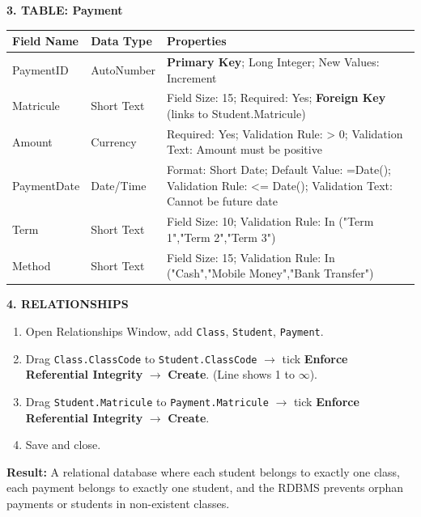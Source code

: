 \documentclass[11pt]{article}
\newcounter{popsec}
\newcounter{popsub}
\newcommand{\courssub}[1]{%
  \stepcounter{popsub}%
  \par\vspace{9pt}\noindent{\popxbold\fontsize{11.5}{13}\selectfont\color{popink}{\color{poporange}\thepopsec.\thepopsub}\hspace{6pt}#1}\par\nopagebreak\vspace{4pt}
}
\begin{document}
\begin{exoresolu}
\textbf{3. TABLE: Payment}
\begin{center}
\begin{tabularx}{\linewidth}{|l|l|X|}\hline
Field Name & Data Type & Properties \\ \hline
PaymentID & AutoNumber & \textbf{Primary Key}; Long Integer; New Values: Increment \\ \hline
Matricule & Short Text & Field Size: 15; Required: Yes; \textbf{Foreign Key} (links to Student.Matricule) \\ \hline
Amount & Currency & Required: Yes; Validation Rule: > 0; Validation Text: Amount must be positive \\ \hline
PaymentDate & Date/Time & Format: Short Date; Default Value: =Date(); Validation Rule: <= Date(); Validation Text: Cannot be future date \\ \hline
Term & Short Text & Field Size: 10; Validation Rule: In ("Term 1","Term 2","Term 3") \\ \hline
Method & Short Text & Field Size: 15; Validation Rule: In ("Cash","Mobile Money","Bank Transfer") \\ \hline
\end{tabularx}
\end{center}

\textbf{4. RELATIONSHIPS}
\begin{enumerate}
    \item Open Relationships Window, add \texttt{Class}, \texttt{Student}, \texttt{Payment}.
    \item Drag \texttt{Class.ClassCode} to \texttt{Student.ClassCode} $\to$ tick \textbf{Enforce Referential Integrity} $\to$ \textbf{Create}. (Line shows 1 to $\infty$).
    \item Drag \texttt{Student.Matricule} to \texttt{Payment.Matricule} $\to$ tick \textbf{Enforce Referential Integrity} $\to$ \textbf{Create}.
    \item Save and close.
\end{enumerate}
\textbf{Result:} A relational database where each student belongs to exactly one class, each payment belongs to exactly one student, and the RDBMS prevents orphan payments or students in non-existent classes.
\end{exoresolu}

\courssub{Summary of Key Points}
\end{document}
